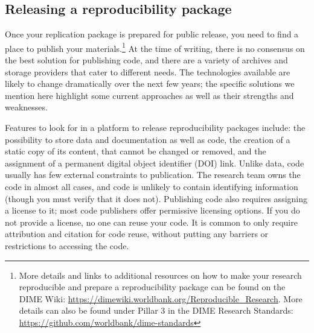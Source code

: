 \documentclass[
]{book}
\begin{document}
\hypertarget{releasing-a-reproducibility-package}{%
\subsection*{Releasing a reproducibility package}\label{releasing-a-reproducibility-package}}

Once your replication package is prepared for public release,
you need to find a place to publish your materials.\footnote{More details and links to additional resources on
  how to make your research reproducible and prepare a reproducibility package
  can be found on the DIME Wiki:
  \url{https://dimewiki.worldbank.org/Reproducible_Research}.
  More details can also be found under Pillar 3 in the DIME Research Standards:
  \url{https://github.com/worldbank/dime-standards}}
At the time of writing, there is no consensus on the best solution for publishing code,
and there are a variety of archives and storage providers
that cater to different needs.
The technologies available are likely to change dramatically
over the next few years;
the specific solutions we mention here highlight some current approaches
as well as their strengths and weaknesses.

Features to look for in a platform to release reproducibility packages include:
the possibility to store data and documentation as well as code,
the creation of a static copy of its content, that cannot be changed or removed,
and the assignment of a permanent digital object identifier (DOI) link.
Unlike data, code usually has few external constraints to publication.
The research team owns the code in almost all cases,
and code is unlikely to contain identifying information
(though you must verify that it does not).
Publishing code also requires assigning a license to it;
most code publishers offer permissive licensing options.
If you do not provide a license, no one can reuse your code.
It is common to only require attribution and citation for code reuse,
without putting any barriers or restrictions to accessing the code.
\end{document}
